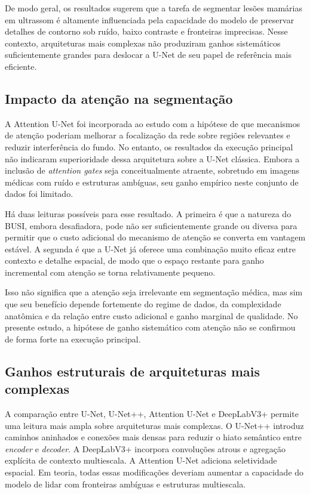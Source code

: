 \documentclass[tcc,capa]{texufpel}
\begin{document}
De modo geral, os resultados sugerem que a tarefa de segmentar lesões mamárias em ultrassom é altamente influenciada pela capacidade do modelo de preservar detalhes de contorno sob ruído, baixo contraste e fronteiras imprecisas. Nesse contexto, arquiteturas mais complexas não produziram ganhos sistemáticos suficientemente grandes para deslocar a U-Net de seu papel de referência mais eficiente.

\subsection{Impacto da atenção na segmentação}

A Attention U-Net foi incorporada ao estudo com a hipótese de que mecanismos de atenção poderiam melhorar a focalização da rede sobre regiões relevantes e reduzir interferência do fundo. No entanto, os resultados da execução principal não indicaram superioridade dessa arquitetura sobre a U-Net clássica. Embora a inclusão de \textit{attention gates} seja conceitualmente atraente, sobretudo em imagens médicas com ruído e estruturas ambíguas, seu ganho empírico neste conjunto de dados foi limitado.

Há duas leituras possíveis para esse resultado. A primeira é que a natureza do BUSI, embora desafiadora, pode não ser suficientemente grande ou diversa para permitir que o custo adicional do mecanismo de atenção se converta em vantagem estável. A segunda é que a U-Net já oferece uma combinação muito eficaz entre contexto e detalhe espacial, de modo que o espaço restante para ganho incremental com atenção se torna relativamente pequeno.

Isso não significa que a atenção seja irrelevante em segmentação médica, mas sim que seu benefício depende fortemente do regime de dados, da complexidade anatômica e da relação entre custo adicional e ganho marginal de qualidade. No presente estudo, a hipótese de ganho sistemático com atenção não se confirmou de forma forte na execução principal.

\subsection{Ganhos estruturais de arquiteturas mais complexas}

A comparação entre U-Net, U-Net++, Attention U-Net e DeepLabV3+ permite uma leitura mais ampla sobre arquiteturas mais complexas. O U-Net++ introduz caminhos aninhados e conexões mais densas para reduzir o hiato semântico entre \textit{encoder} e \textit{decoder}. A DeepLabV3+ incorpora convoluções atrous e agregação explícita de contexto multiescala. A Attention U-Net adiciona seletividade espacial. Em teoria, todas essas modificações deveriam aumentar a capacidade do modelo de lidar com fronteiras ambíguas e estruturas multiescala.
\end{document}
